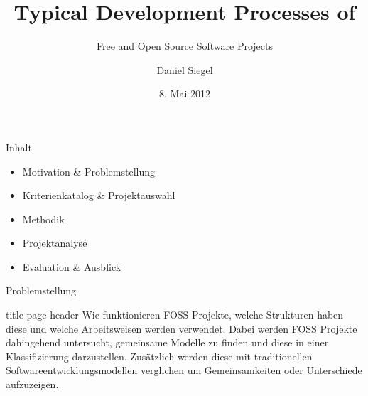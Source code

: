\documentclass[11pt]{beamer}
\author{Daniel Siegel}
\title{Typical Development Processes of}%
\subtitle{Free and Open Source Software Projects}
\institute{Technische Universität München}
\date{8. Mai 2012}
\begin{document}
\begin{frame}[t,plain]
  \titlepage
\end{frame}

\begin{frame}[t]{Inhalt}
  \begin{itemize}
    \item Motivation \& Problemstellung
    \item Kriterienkatalog \& Projektauswahl
    \item Methodik
    \item Projektanalyse
    \item Evaluation \& Ausblick
  \end{itemize}
\end{frame}

\begin{frame}{Problemstellung}

\begin{beamercolorbox}[sep=1em]{title page header}
  Wie funktionieren FOSS Projekte, welche Strukturen haben diese und welche
  Arbeitsweisen werden verwendet. Dabei werden FOSS Projekte dahingehend
  untersucht, gemeinsame Modelle zu finden und diese in einer Klassifizierung
  darzustellen. Zusätzlich werden diese mit traditionellen
  Softwareentwicklungsmodellen verglichen um Gemeinsamkeiten oder Unterschiede
  aufzuzeigen.
\end{beamercolorbox}
\end{frame}
\end{document}
